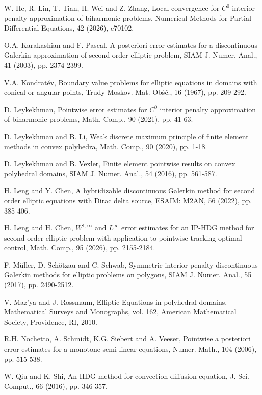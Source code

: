 \documentclass[1996/10/24]{amsart}
\theoremstyle{definition}
\numberwithin{equation}{section}
\begin{document}
\begin{thebibliography}{}
W. He, R. Lin, T. Tian, H. Wei and Z. Zhang, Local convergence for $C^0$ interior penalty approximation of biharmonic problems, Numerical Methods for
Partial Differential Equations, 42 (2026), e70102.

O.A. Karakashian and F. Pascal, A posteriori error estimates for a discontinuous Galerkin approximation of second-order elliptic problem, SIAM J. Numer. Anal.,
41 (2003), pp. 2374-2399.

V.A. Kondrat\'{e}v, Boundary value problems for elliptic equations in domains with conical or angular points, Trudy Moskov. Mat. Ob\v{s}\v{c}., 16 (1967),
pp. 209-292.

D. Leykekhman, Pointwise error estimates for $C^0$ interior penalty approximation of biharmonic problems, Math. Comp., 90 (2021), pp. 41-63.

D. Leykekhman and B. Li, Weak discrete maximum principle of finite element methods in convex polyhedra, Math. Comp., 90 (2020), pp. 1-18.

D. Leykekhman and B. Vexler, Finite element pointwise results on convex polyhedral domains, SIAM J. Numer. Anal., 54 (2016), pp. 561-587.

H. Leng and Y. Chen, A hybridizable discontinuous Galerkin method for second order elliptic equations with Dirac delta source, ESAIM: M2AN, 56 (2022), pp.
385-406.

H. Leng and H. Chen, $W^{1,\infty}$ and $L^{\infty}$ error estimates for an IP-HDG method for second-order elliptic problem with application to pointwise tracking optimal control, Math. Comp., 95 (2026), pp. 2155-2184.

F. M\"{u}ller, D. Sch\"{o}tzau and C. Schwab, Symmetric interior penalty discontinuous Galerkin methods for elliptic problems on polygons, SIAM J. Numer. Anal., 55 (2017), pp. 2490-2512.

V. Maz'ya and J. Rossmann, Elliptic Equations in polyhedral domains, Mathematical Surveys and Monographs, vol. 162, American Mathematical Society, Providence, RI, 2010.

R.H. Nochetto, A. Schmidt, K.G. Siebert and A. Veeser, Pointwise a posteriori error estimates for a monotone semi-linear equations, Numer. Math., 104 (2006),
pp. 515-538.

W. Qiu and K. Shi, An HDG method for convection diffusion equation, J. Sci. Comput., 66 (2016), pp. 346-357.


\end{thebibliography}
\end{document}
